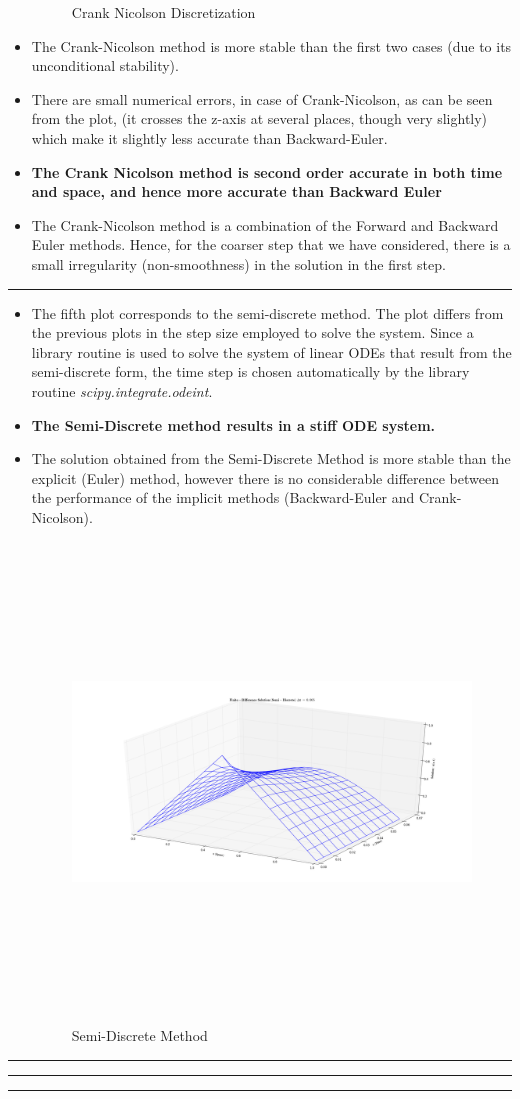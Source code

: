 \begin{itemize}
\begin{figure}[H]
\caption{Crank Nicolson Discretization }
\end{figure}
\item The Crank-Nicolson method is more stable than the first two cases (due to its unconditional stability). 
\item There are small numerical errors, in case of Crank-Nicolson, as can be seen from the plot, (it crosses the z-axis at several places, though very slightly) which make it slightly less accurate than Backward-Euler. 
\item { \bf The Crank Nicolson method is second order accurate in both time and space, and hence more accurate than Backward Euler}
\item The Crank-Nicolson method is a combination of the Forward and Backward Euler methods. Hence, for the coarser step that we have considered, there is a small irregularity (non-smoothness) in the solution in the first step.  
\end{itemize}\hrule
\newpage
\begin{itemize}
\item The fifth plot corresponds to the semi-discrete method. The plot differs from the previous plots in the step size employed to solve the system. Since a library routine is used to solve the system of linear ODEs that result from the semi-discrete form, the time step is chosen automatically by the library routine \emph{scipy.integrate.odeint}. 
\item {\bf The Semi-Discrete method results in a stiff ODE system.}
\item The solution obtained from the Semi-Discrete Method is more stable than the explicit (Euler) method, however there is no considerable difference between the performance of the implicit methods (Backward-Euler and Crank-Nicolson).
\begin{figure}[H]
\includegraphics[width=7in, height=5in]{Fig5}
\caption{Semi-Discrete Method }
\end{figure}
\end{itemize}\hrule\hrule\hrule
